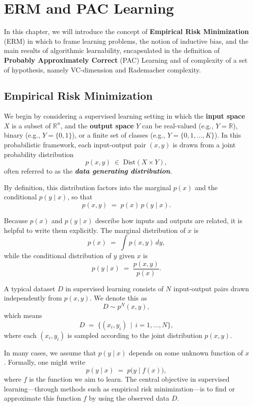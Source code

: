 \newpage
\chapter{ERM and PAC Learning}

In this chapter, we will introduce the concept of \textbf{Empirical Risk Minimization} (ERM) in which to frame learning problems, the notion of inductive bias, and the main results of algorithmic learnability, encapsulated in the definition of \textbf{Probably Approximately Correct} (PAC) Learning and of complexity of a set of hypothesis, namely
VC-dimension and Rademacher complexity.

\section{Empirical Risk Minimization}

We begin by considering a supervised learning setting in which the \textbf{input space} $X$ is a subset of $\mathbb{R}^n$, and the \textbf{output space} $Y$ can be real-valued (e.g., $Y = \mathbb{R}$), binary (e.g., $Y = \{0,1\}$), or a finite set of classes (e.g., $Y = \{0,1,\ldots,K\}$). In this probabilistic framework, each input-output pair $(x,y)$ is drawn from a joint probability distribution
$$
p(x,y) \;\in\; \mathrm{Dist}(X \times Y),
$$
often referred to as the \emph{\textbf{data generating distribution}}. 

By definition, this distribution factors into the marginal $p(x)$ and the conditional $p(y \mid x)$, so that
$$
p(x,y) \;=\; p(x)\,p(y \mid x).
$$

Because $p(x)$ and $p(y \mid x)$ describe how inputs and outputs are related, it is helpful to write them explicitly. The marginal distribution of $x$ is
$$
p(x) \;=\; \int p(x,y)\,dy,
$$
while the conditional distribution of $y$ given $x$ is
$$
p(y \mid x) \;=\; \frac{p(x,y)}{p(x)}.
$$

A typical dataset $D$ in supervised learning consists of $N$ input-output pairs drawn independently from $p(x,y)$. We denote this as
$$
D \sim p^N(x,y),
$$
which means
$$
D \;=\; \{(x_i, y_i) \,\mid\, i = 1, \dots, N\},
$$
where each $(x_i, y_i)$ is sampled according to the joint distribution $p(x,y)$. 

In many cases, we assume that $p(y \mid x)$ depends on some unknown function of $x$. Formally, one might write
$$
p(y \mid x) \;=\; p\bigl(y \mid f(x)\bigr),
$$
where $f$ is the function we aim to learn. The central objective in supervised learning—through methods such as empirical risk minimization—is to find or approximate this function $f$ by using the observed data $D$.

